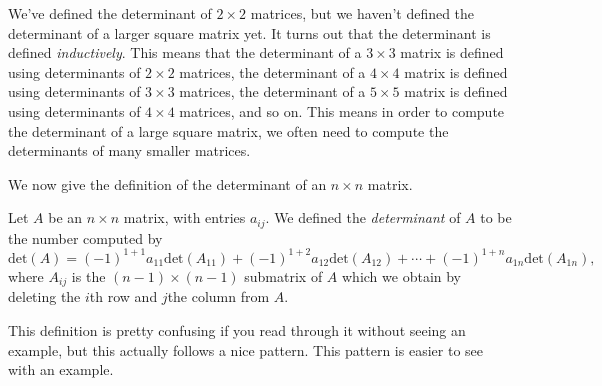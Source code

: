 \documentclass{ximera}
\begin{document}
We've defined the determinant of $2\times 2$ matrices, but we haven't defined the determinant of a larger square matrix yet. It turns out that the determinant is defined \emph{inductively}. This means that the determinant of a $3\times 3$ matrix is defined using determinants of $2\times 2$ matrices, the determinant of a $4\times 4$ matrix is defined using determinants of $3\times 3$ matrices, the determinant of a $5\times 5$ matrix is defined using determinants of $4\times 4$ matrices, and so on. This means in order to compute the determinant of a large square matrix, we often need to compute the determinants of many smaller matrices.

We now give the definition of the determinant of an $n\times n$ matrix.

\begin{definition}
Let $A$ be an $n\times n$ matrix, with entries $a_{ij}$. We defined the \emph{determinant} of $A$ to be the number computed by
\[
\textrm{det}(A) = (-1)^{1+1}a_{11}\textrm{det}(A_{11}) + (-1)^{1+2}a_{12}\textrm{det}(A_{12}) + \cdots + (-1)^{1+n}a_{1n}\textrm{det}(A_{1n}),
\]
where $A_{ij}$ is the $(n-1)\times (n-1)$ submatrix of $A$ which we obtain by deleting the $i$th row and $j$the column from $A$.
\end{definition}

This definition is pretty confusing if you read through it without seeing an example, but this actually follows a nice pattern. This pattern is easier to see with an example.
\end{document}
